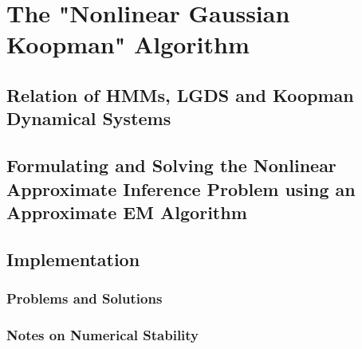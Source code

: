 \chapter{The "Nonlinear Gaussian Koopman" Algorithm}  %
\label{c:nonlinearGaussianKoopman}




\section{Relation of HMMs, LGDS and Koopman Dynamical Systems}


\section{Formulating and Solving the Nonlinear Approximate Inference Problem using an Approximate EM Algorithm}


\section{Implementation}


	\subsection{Problems and Solutions}

	\subsection{Notes on Numerical Stability}
